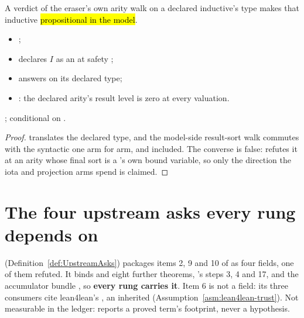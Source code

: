 \begin{theorem}
\label{thm:ErasureSpec-propositionalInd_of_arity}
\leanok
{}
 A  verdict of the eraser's own arity walk on a declared inductive's
type makes that inductive \hl{propositional in the model}.
\begin{itemize}
\item {} ;
\item {} declares $I$ as an  at safety ;
\item {} answers  on its declared type;
\item {} : the declared arity's result level is zero at
every valuation.
\end{itemize}
 \stProved{}; conditional on \stAssumed{} .
\end{theorem}
\begin{proof}
\leanok
{}
  translates the declared type, and the model-side result-sort
walk commutes with the syntactic one arm for arm,  and  included.
 The converse is false:  refutes it at an
arity whose final sort is a 's own bound variable, so only the direction the iota and
projection arms spend is claimed.
\end{proof}

\section{The four upstream asks every rung depends on}
\label{sec:trust:upstream}

 (Definition~\ref{def:UpstreamAsks}) packages items 2, 9 and 10 of
 as four fields, one of them refuted. It binds 
and eight further theorems, 's steps 3, 4 and 17, and the
accumulator bundle , so \textbf{every rung carries it}. Item 6 is not a field: its
three consumers cite lean4lean's , an inherited 
(Assumption~\ref{asm:lean4lean-trust}). Not measurable in the ledger: 
reports a proved term's footprint, never a hypothesis.

